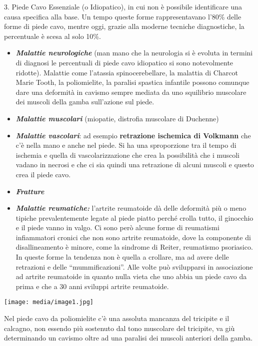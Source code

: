 \documentclass[]{article}
\begin{document}
3. Piede Cavo Essenziale (o Idiopatico), in cui non è possibile
identificare una causa specifica alla base. Un tempo queste forme
rappresentavano l'80\% delle forme di piede cavo, mentre oggi, grazie
alla moderne tecniche diagnostiche, la percentuale è scesa al solo 10\%.

\begin{itemize}
\item
  \emph{\textbf{Malattie neurologiche}} (man mano che la neurologia si è
  evoluta in termini di diagnosi le percentuali di piede cavo idiopatico
  si sono notevolmente ridotte). Malattie come l'atassia
  spinocerebellare, la malattia di Charcot Marie Tooth, la poliomielite,
  la paralisi spastica infantile possono comunque dare una deformità in
  cavismo sempre mediata da uno squilibrio muscolare dei muscoli della
  gamba sull'azione sul piede.
\item
  \emph{\textbf{Malattie muscolari}} (miopatie, distrofia muscolare di
  Duchenne)
\item
  \emph{\textbf{Malattie vascolari}}: ad esempio \textbf{retrazione
  ischemica di Volkmann} che c'è nella mano e anche nel piede. Si ha una
  sproporzione tra il tempo di ischemia e quella di vascolarizzazione
  che crea la possibilità che i muscoli vadano in necrosi e che ci sia
  quindi una retrazione di alcuni muscoli e questo crea il piede cavo.
\item
  \emph{\textbf{Fratture }}
\item
  \emph{\textbf{Malattie reumatiche:}} l'artrite reumatoide dà delle
  deformità più o meno tipiche prevalentemente legate al piede piatto
  perché crolla tutto, il ginocchio e il piede vanno in valgo. Ci sono
  però alcune forme di reumatismi infiammatori cronici che non sono
  artrite reumatoide, dove la componente di disallineamento è minore,
  come la sindrome di Reiter, reumatismo psoriasico. In queste forme la
  tendenza non è quella a crollare, ma ad avere delle retrazioni e delle
  ``mummificazioni''. Alle volte può svilupparsi in associazione ad
  artrite reumatoide in quanto nulla vieta che uno abbia un piede cavo
  da prima e che a 30 anni sviluppi artrite reumatoide.
\end{itemize}

\texttt{[image: media/image1.jpg]}

Nel piede cavo da poliomielite c'è una assoluta mancanza del tricipite e
il calcagno, non essendo più sostenuto dal tono muscolare del tricipite,
va giù determinando un cavismo oltre ad una paralisi dei muscoli
anteriori della gamba.
\end{document}
